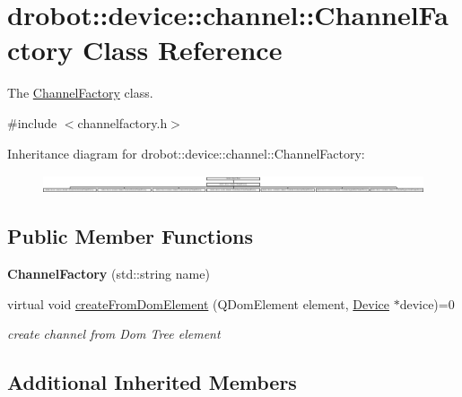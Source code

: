 \hypertarget{classdrobot_1_1device_1_1channel_1_1ChannelFactory}{\section{drobot\-:\-:device\-:\-:channel\-:\-:Channel\-Factory Class Reference}
\label{classdrobot_1_1device_1_1channel_1_1ChannelFactory}
}


The \hyperlink{classdrobot_1_1device_1_1channel_1_1ChannelFactory}{Channel\-Factory} class.  




{\ttfamily \#include $<$channelfactory.\-h$>$}

Inheritance diagram for drobot\-:\-:device\-:\-:channel\-:\-:Channel\-Factory\-:\begin{figure}[H]
\begin{center}
\leavevmode
\includegraphics[height=0.538117cm]{classdrobot_1_1device_1_1channel_1_1ChannelFactory}
\end{center}
\end{figure}
\subsection*{Public Member Functions}
\begin{DoxyCompactItemize}
\item 
\hypertarget{classdrobot_1_1device_1_1channel_1_1ChannelFactory_ab563684681065c52b85620d60b2abdf8}{{\bfseries Channel\-Factory} (std\-::string name)}\label{classdrobot_1_1device_1_1channel_1_1ChannelFactory_ab563684681065c52b85620d60b2abdf8}

\item 
virtual void \hyperlink{classdrobot_1_1device_1_1channel_1_1ChannelFactory_ab59ee44782347b8878a471bf87f06c43}{create\-From\-Dom\-Element} (Q\-Dom\-Element element, \hyperlink{classdrobot_1_1device_1_1Device}{Device} $\ast$device)=0
\begin{DoxyCompactList}\small\item\em create channel from Dom Tree element \end{DoxyCompactList}\end{DoxyCompactItemize}
\subsection*{Additional Inherited Members}


